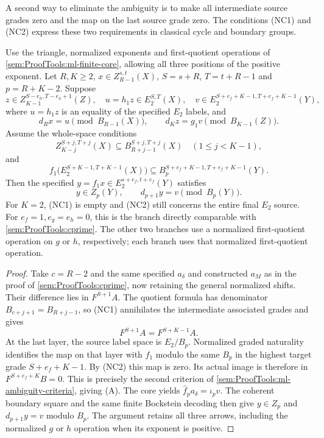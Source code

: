 \begin{theorem}
\label{sem:ProofTools:ml-classical-nc}
A second way to eliminate the ambiguity is to make all intermediate
source grades zero and the map on the last source grade zero.
The conditions (NC1) and (NC2) express these two requirements in
classical cycle and boundary groups.\par
Use the triangle, normalized exponents and first-quotient operations of
\ref{sem:ProofTools:ml-finite-core}, allowing all three positions of the
positive exponent. Let $R,K\geq2$, $x\in Z_{R-1}^{s,t}(X)$,
$S=s+R$, $T=t+R-1$ and $p=R+K-2$. Suppose
\[
 z\in Z_{K-1}^{S-e_h,T-e_h+1}(Z),\quad
 u=h_1z\in E_2^{S,T}(X),\quad
 v\in E_2^{S+e_f+K-1,T+e_f+K-1}(Y),
\]
where $u=h_1z$ is an equality of the specified $E_2$ labels, and
\[
 d_Rx=u\pmod{B_{R-1}(X)},\qquad
 d_Kz=g_1v\pmod{B_{K-1}(Z)}.
\]
Assume the whole-space conditions
\[
 Z_{K-j}^{S+j,T+j}(X)\subseteq B_{R+j-1}^{S+j,T+j}(X)
 \quad(1\leq j<K-1),
\tag{NC1}
\]
and
\[
 f_1\bigl(E_2^{S+K-1,T+K-1}(X)\bigr)
 \subseteq B_p^{S+e_f+K-1,T+e_f+K-1}(Y).
\tag{NC2}
\]
Then the specified $y=f_1x\in E_2^{s+e_f,t+e_f}(Y)$ satisfies
\[
 y\in Z_p(Y),\qquad d_{p+1}y=v\pmod{B_p(Y)}.
\]
For $K=2$, (NC1) is empty and (NC2) still concerns the entire final
$E_2$ source. For $e_f=1,e_g=e_h=0$, this is the branch directly
comparable with \ref{sem:ProofTools:cprime}. The other two branches use
a normalized first-quotient operation on $g$ or $h$, respectively;
each branch uses that normalized first-quotient operation.
\end{theorem}
\begin{proof}
Take $c=R-2$ and the same specified $a_\delta$ and constructed $a_M$
as in the proof of \ref{sem:ProofTools:cprime}, now retaining the general
normalized shifts. Their difference lies in $F^{S+1}A$.
The quotient formula has denominator $B_{c+j+1}=B_{R+j-1}$, so (NC1)
annihilates the intermediate associated grades and gives
\[
 F^{S+1}A=F^{S+K-1}A.
\]
At the last layer, the source label space is $E_2/B_p$.
Normalized graded naturality identifies the map on that layer with
$f_1$ modulo the same $B_p$ in the highest target grade
$S+e_f+K-1$. By (NC2) this map is zero. Its actual image is therefore
in $F^{S+e_f+K}B=0$. This is precisely the second criterion of
\ref{sem:ProofTools:ml-ambiguity-criteria}, giving (A).
The core yields $\widehat f_pa_\delta=\iota_pv$.
The coherent boundary square and the same finite Bockstein decoding
then give $y\in Z_p$ and $d_{p+1}y=v$ modulo $B_p$.
The argument retains all three arrows, including the normalized
$g$ or $h$ operation when its exponent is positive.
\end{proof}

